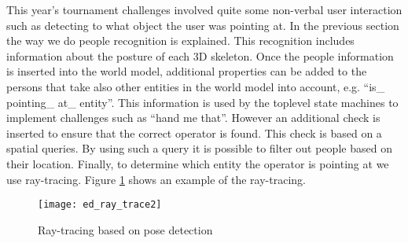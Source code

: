 This year’s tournament challenges involved quite some non-verbal user interaction such as detecting to what object the user was pointing at. In the previous section the way we do people recognition is explained. This recognition includes information about the posture of each 3D skeleton. Once the people information is inserted into the world model, additional properties can be added to the persons that take also other entities in the world model into account, e.g. “is\_ pointing\_ at\_ entity”. This information is used by the toplevel state machines to implement challenges such as “hand me that”. However an additional check is inserted to ensure that the correct operator is  found. This check is based on a spatial queries. By using such a query it is possible to filter out people based on their location. Finally, to determine which entity the operator is pointing at we use ray-tracing. Figure \ref{fig:ray_trace} shows an example of the ray-tracing.

\begin{figure}[H]
	\centering
    \texttt{[image: ed\_ray\_trace2]}
	\caption{Ray-tracing based on pose detection}
	\label{fig:ray_trace}
\end{figure}


